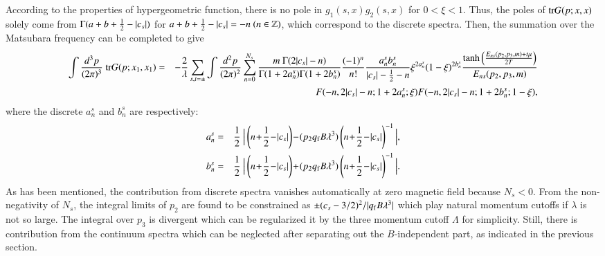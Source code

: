 \documentclass[aps,prd,amsmath,two column,amssymb,showpacs]{revtex4}
\begin{document}
\begin{widetext}
According to the properties of hypergeometric function, there is no pole in $g_1(s,x)g_2(s,x)$ for $0<\xi<1$. Thus, the poles of ${\rm tr}G(p;x,x)$ solely come from $\Gamma(a+b+{1\over2}-|c_s|)$ for $a+b+{1\over2}-|c_s|=-n\ (n\in \mathbb{Z})$, which correspond to the discrete spectra. Then, the summation over the Matsubara frequency can be completed to give
\begin{eqnarray}
\int{d^3p\over (2\pi)^3}~{\rm tr}G(p;x_1,x_1)&=&-{2\over\lambda}\sum_{s,t=\pm}\int{d^2p\over (2\pi)^2}\sum_{n=0}^{N_s}{m~\Gamma(2|c_s|-n)\over \Gamma(1+2a_n^s)\Gamma(1+2b_n^s)}{(-1)^n\over n!}{a_n^sb_n^s\over|c_s|-{1\over2}-n}\xi^{2a_n^s}(1-\xi)^{2b_n^s}{\tanh\Big({E_{ns}(p_2,p_3,m)+t\mu\over2T}\Big)\over E_{ns}(p_2,p_3,m)}\nonumber\\
&&F(-n,2|c_s|-n;1+2a_n^s;\xi)F(-n,2|c_s|-n;1+2b_n^s;1-\xi),
\end{eqnarray} 
where the discrete $a_n^s$ and $b_n^s$ are respectively:
\begin{eqnarray}
a_n^s&=&{1\over2}~\Big|\left(n\!+\!{1\over2}\!-\!|c_s|\right)\!-\!(p_2q_{\rm f}B\lambda^3)\left(n\!+\!{1\over2}\!-\!|c_s|\right)^{-1}\Big|,\nonumber\\
b_n^s&=&{1\over2}~\Big|\left(n\!+\!{1\over2}\!-\!|c_s|\right)\!+\!(p_2q_{\rm f}B\lambda^3)\left(n\!+\!{1\over2}\!-\!|c_s|\right)^{-1}\Big|.
\end{eqnarray}
As has been mentioned, the contribution from discrete spectra vanishes automatically at zero magnetic field because $N_s<0$. 
From the non-negativity of $N_s$, the integral limits of $p_2$ are found to be constrained as $\pm (c_s-{3/2})^2/|q_{\rm f}B\lambda^3|$ which play natural momentum cutoffs if $\lambda$ is not so large. The integral over $p_3$ is divergent which can be regularized it by the three momentum cutoff $\Lambda$ for simplicity. Still, there is contribution from the continuum spectra which can be neglected after separating out the $B$-independent part, as indicated in the previous section.
 

\end{widetext}
\end{document}

